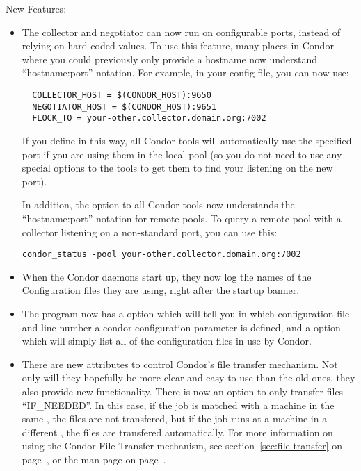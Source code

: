 \noindent New Features:
\begin{itemize}

\item The collector and negotiator can now run on configurable
ports, instead of relying on hard-coded values.
To use this feature, many places in Condor where you could previously
only provide a hostname now understand ``hostname:port'' notation.
For example, in your config file, you can now use:

\begin{verbatim}
  COLLECTOR_HOST = $(CONDOR_HOST):9650
  NEGOTIATOR_HOST = $(CONDOR_HOST):9651
  FLOCK_TO = your-other.collector.domain.org:7002
\end{verbatim}

If you define  in this way, all Condor tools
will automatically use the specified port if you are using them in the
local pool (so you do not need to use any special options to the tools
to get them to find your  listening on the new port).

In addition, the  option to all Condor tools now
understands the ``hostname:port'' notation for remote pools.
To query a remote pool with a collector listening on a non-standard
port, you can use this:

\begin{verbatim}
condor_status -pool your-other.collector.domain.org:7002
\end{verbatim}

\item When the Condor daemons start up, they now log the names of the
Configuration files they are using, right after the startup banner.

\item The  program now has a  option
  which will tell you in which configuration file and line number a
  condor configuration parameter is defined, and a 
  option which will simply list all of the configuration files in use
  by Condor.

\item There are new attributes to control Condor's file transfer
  mechanism.
  Not only will they hopefully be more clear and easy to use than the
  old ones, they also provide new functionality.
  There is now an option to only transfer files ``IF\_NEEDED''.
  In this case, if the job is matched with a machine in the same
  , the files are not transfered, but if the
  job runs at a machine in a different , the
  files are transfered automatically.
  For more information on using the Condor File Transfer mechanism,
  see section~\ref{sec:file-transfer} on
  page~\pageref{sec:file-transfer}, or the  man
  page on page~\pageref{man-condor-submit}.


\end{itemize}
